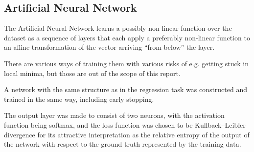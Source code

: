 \subsection{Artificial Neural Network}
The Artificial Neural Network learns a possibly non-linear function
over the dataset as a sequence of layers that each apply
a preferably non-linear function to an affine transformation of the vector arriving
``from below'' the layer.

There are various ways of training them with various risks of e.g.
getting stuck in local minima, but those are out of the scope of this report.

A network with the same structure as in the regression task was constructed and trained in the same way,
including early stopping.

The output layer was made to consist of two neurons,
with the activation function being softmax,
and the loss function was chosen to be Kullback–Leibler divergence
for its attractive interpretation as the relative entropy
of the output of the network with respect to the ground truth
represented by the training data.

